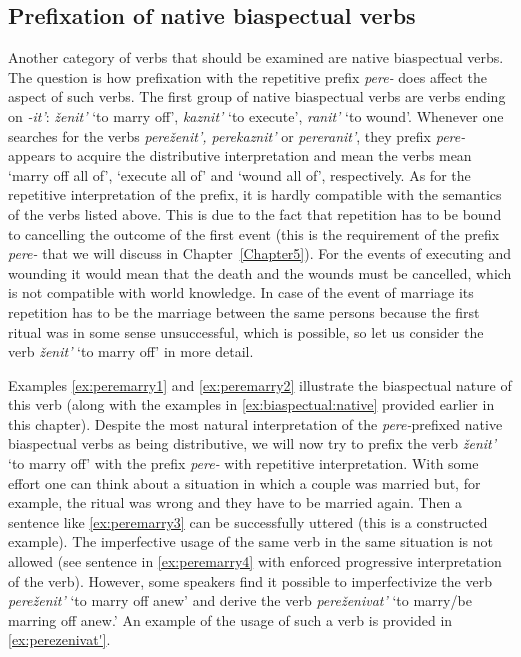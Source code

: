 \subsection{Prefixation of native biaspectual verbs}\label{subsection:perf:native}
Another category of verbs that should be examined are native biaspectual verbs. The question is how prefixation with the repetitive prefix \textit{pere-} does affect the aspect of such verbs. The first group of native biaspectual verbs are verbs ending on \textit{-it'}: \textit{\v{z}enit'} `to marry off', \textit{kaznit'} `to execute', \textit{ranit'} `to wound'. Whenever one searches for the verbs \textit{pere\v{z}enit', perekaznit'} or \textit{pereranit'}, they prefix \textit{pere-} appears to acquire the distributive interpretation and mean the verbs mean `marry off all of', `execute all of' and `wound all of', respectively. As for the repetitive interpretation of the prefix, it is hardly compatible with the semantics of the verbs listed above. This is due to the fact that repetition has to be bound to cancelling the outcome of the first event (this is the requirement of the prefix \textit{pere-} that we will discuss in Chapter~\ref{Chapter5}). For the events of executing and wounding it would mean that the death and the wounds must be cancelled, which is not compatible with world knowledge. In case of the event of marriage its repetition has to be the marriage between the same persons because the first ritual was in some sense unsuccessful, which is possible, so let us consider the verb \textit{\v{z}enit'} `to marry off' in more detail. 

Examples \ref{ex:peremarry1} and \ref{ex:peremarry2} illustrate the biaspectual nature of this verb (along with the examples in \ref{ex:biaspectual:native} provided earlier in this chapter). Despite the most natural interpretation of the \textit{pere-}prefixed native biaspectual verbs as being distributive, we will now try to prefix the verb \textit{\v{z}enit'} `to marry off' with the prefix \textit{pere-} with repetitive interpretation. With some effort one can think about a situation in which a couple was married but, for example, the ritual was wrong and they have to be married again. Then a sentence like \ref{ex:peremarry3} can be successfully uttered (this is a constructed example). The imperfective usage of the same verb in the same situation is not allowed (see sentence in \ref{ex:peremarry4} with enforced progressive interpretation of the verb). However, some speakers find it possible to imperfectivize the verb \textit{pere\v{z}enit'} `to marry off anew' and derive the verb \textit{pere\v{z}enivat'} `to marry/be marring off anew.' An example of the usage of such a verb is provided in \ref{ex:perezenivat'}. 

